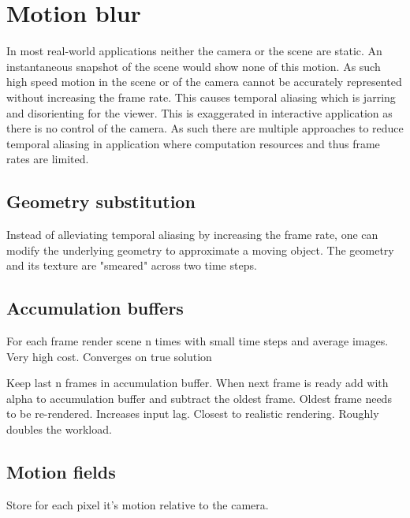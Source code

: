 \chapter{Motion blur}
In most real-world applications neither the camera or the scene are static.
An instantaneous snapshot of the scene would show none of this motion.
As such high speed motion in the scene or of the camera cannot be accurately represented without increasing the frame rate.
This causes temporal aliasing which is jarring and disorienting for the viewer.
This is exaggerated in interactive application as there is no control of the camera.
As such there are multiple approaches to reduce temporal aliasing in application where computation resources and thus frame rates are limited.

\section{Geometry substitution}
Instead of alleviating temporal aliasing by increasing the frame rate, one can modify the underlying geometry to approximate a moving object.
The geometry and its texture are "smeared" across two time steps.

\section{Accumulation buffers}
For each frame render scene n times with small time steps and average images.
Very high cost.
Converges on true solution

Keep last n frames in accumulation buffer.
When next frame is ready add with alpha to accumulation buffer and subtract the oldest frame.
Oldest frame needs to be re-rendered.
Increases input lag. Closest to realistic rendering. Roughly doubles the workload.

\section{Motion fields}
Store for each pixel it's motion relative to the camera. 

